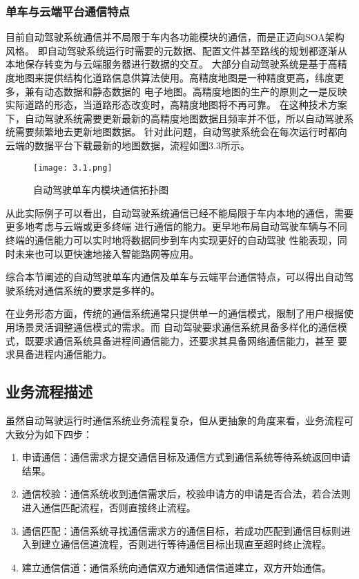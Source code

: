 \subsubsection{单车与云端平台通信特点}
目前自动驾驶系统通信并不局限于车内各功能模块的通信，而是正迈向SOA架构风格。
即自动驾驶系统运行时需要的元数据、配置文件甚至路线的规划都逐渐从本地保存转变为与云端服务器进行数据的交互。
大部分自动驾驶系统是基于高精度地图来提供结构化道路信息供算法使用。高精度地图是一种精度更高，纬度更多，兼有动态数据和静态数据的
电子地图。高精度地图的生产的原则之一是反映实际道路的形态，当道路形态改变时，高精度地图将不再可靠。
在这种技术方案下，自动驾驶系统需要更新最新的高精度地图数据且频率并不低，所以自动驾驶系统需要频繁地去更新地图数据。
针对此问题，自动驾驶系统会在每次运行时都向云端的数据平台下载最新的地图数据，流程如图3.3所示。
\begin{figure}[htb]
  \centering
  \texttt{[image: 3.1.png]}
  \caption{自动驾驶单车内模块通信拓扑图}
  \label{fig:15}
\end{figure}
从此实际例子可以看出，自动驾驶系统通信已经不能局限于车内本地的通信，需要更多地考虑与云端或更多终端
进行通信的能力。更早地布局自动驾驶车辆与不同终端的通信能力可以实时地将数据同步到车内实现更好的自动驾驶
性能表现，同时未来也可以更快速地接入智能路网等应用。

综合本节阐述的自动驾驶单车内通信及单车与云端平台通信特点，可以得出自动驾驶系统对通信系统的要求是多样的。

在业务形态方面，传统的通信系统通常只提供单一的通信模式，限制了用户根据使用场景灵活调整通信模式的需求。而
自动驾驶要求通信系统具备多样化的通信模式，既要求通信系统具备进程间通信能力，还要求其具备网络通信能力，甚至
要求具备进程内通信能力。

\subsection{业务流程描述}
虽然自动驾驶运行时通信系统业务流程复杂，但从更抽象的角度来看，业务流程可大致分为如下四步：
\begin{enumerate}
  \item 申请通信：通信需求方提交通信目标及通信方式到通信系统等待系统返回申请结果。
  \item 通信校验：通信系统收到通信需求后，校验申请方的申请是否合法，若合法则进入通信匹配流程，否则直接终止流程。
  \item 通信匹配：通信系统寻找通信需求方的通信目标，若成功匹配到通信目标则进入到建立通信信道流程，否则进行等待通信目标出现直至超时终止流程。
  \item 建立通信信道：通信系统向通信双方通知通信信道建立，双方开始通信。
\end{enumerate}

